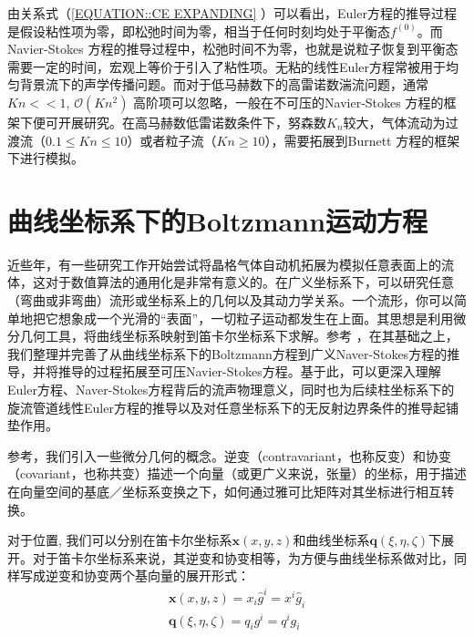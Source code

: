 \documentclass[LBMDerivation.tex]{subfiles}
\begin{document}
由关系式（\ref{EQUATION::CE EXPANDING} ）可以看出，Euler方程的推导过程是假设粘性项为零，即松弛时间为零，相当于任何时刻均处于平衡态$f^{(0)}$。而 Navier-Stokes 方程的推导过程中，松弛时间不为零，也就是说粒子恢复到平衡态需要一定的时间，宏观上等价于引入了粘性项。无粘的线性Euler方程常被用于均匀背景流下的声学传播问题。而对于低马赫数下的高雷诺数湍流问题，通常$Kn << 1$, $\mathcal{O}\left(K n^{2}\right)$ 高阶项可以忽略，一般在不可压的Navier-Stokes 方程的框架下便可开展研究。在高马赫数低雷诺数条件下，努森数$K_n$较大，气体流动为过渡流（$0.1\leq Kn\leq 10$）或者粒子流（$Kn\geq10$），需要拓展到Burnett 方程的框架下进行模拟。




%
%
%
%
\section{曲线坐标系下的Boltzmann运动方程}
%
%
近些年，有一些研究工作开始尝试将晶格气体自动机拓展为模拟任意表面上的流体，这对于数值算法的通用化是非常有意义的。在广义坐标系下，可以研究任意（弯曲或非弯曲）流形或坐标系上的几何以及其动力学关系。一个流形，你可以简单地把它想象成一个光滑的“表面”，一切粒子运动都发生在上面。其思想是利用微分几何工具，将曲线坐标系映射到笛卡尔坐标系下求解。参考 \cite{love2011boltzmann, mendoza2013flow,viggen2014lattice,ChenHudong2021LBM}，在其基础之上，我们整理并完善了从曲线坐标系下的Boltzmann方程到广义Naver-Stokes方程的推导，并将推导的过程拓展至可压Navier-Stokes方程。基于此，可以更深入理解Euler方程、Naver-Stokes方程背后的流声物理意义，同时也为后续柱坐标系下的旋流管道线性Euler方程的推导以及对任意坐标系下的无反射边界条件的推导起铺垫作用。
%
%




参考\cite{kajishima2016computational}，我们引入一些微分几何的概念。逆变（contravariant，也称反变）和协变（covariant，也称共变）描述一个向量（或更广义来说，张量）的坐标，用于描述在向量空间的基底／坐标系变换之下，如何通过雅可比矩阵对其坐标进行相互转换。

对于位置, 我们可以分别在笛卡尔坐标系$\boldsymbol{x}(x,y,z)$和曲线坐标系$\boldsymbol{q}(\xi,\eta,\zeta)$下展开。对于笛卡尔坐标系来说，其逆变和协变相等，为方便与曲线坐标系做对比，同样写成逆变和协变两个基向量的展开形式：
%
%
\begin{equation}
  \begin{aligned}
    \boldsymbol{x}(x,y,z)=x_{i} \widehat{g}^{i}=x^{i} \widehat{g}_{i} \\
    \boldsymbol{q}(\xi,\eta,\zeta)=q_{i} g^{i}=q^{i} g_{i}
  \end{aligned}
\end{equation}
\end{document}
